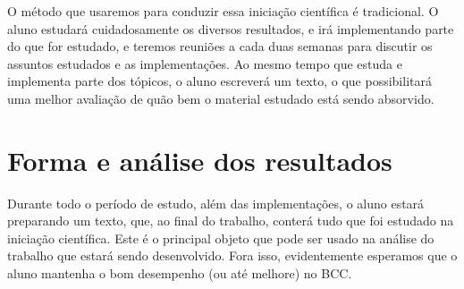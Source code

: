 \documentclass[12pt]{article}
\begin{document}
O método que usaremos para conduzir essa iniciação científica é tradicional. 
O aluno estudará cuidadosamente os diversos resultados, e irá implementando 
parte do que for estudado, e teremos reuniões a cada duas semanas para discutir 
os assuntos estudados e as implementações.  Ao mesmo tempo que estuda e implementa
parte dos tópicos, o aluno escreverá um texto, o que possibilitará uma melhor 
avaliação de quão bem o material estudado está sendo absorvido.

\section{Forma e análise dos resultados}

Durante todo o período de estudo, além das implementações, o aluno estará preparando 
um texto, que, ao final do trabalho, conterá tudo que foi estudado na iniciação científica. 
Este é o principal objeto que pode ser usado na análise do trabalho que estará sendo desenvolvido.
Fora isso, evidentemente esperamos que o aluno mantenha o bom desempenho (ou até melhore) no BCC. 



\end{document}
